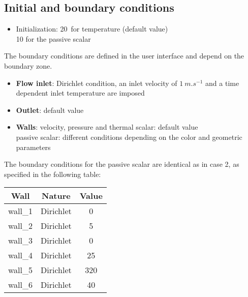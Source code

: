 	\subsection{Initial and boundary conditions}

\begin{itemize}
\renewcommand{\labelitemi}{$\rightarrow$}
	\item Initialization: 20\degresC\ for temperature (default value) \\
	\hspace*{2.1cm}        10 for the passive scalar
\end{itemize}

The boundary conditions are defined in the user interface and depend on the
boundary zone.

\begin{itemize}
	\item {\bfseries Flow inlet}: Dirichlet condition, an inlet velocity of
$1\ m.s^{-1}$ and a time dependent inlet temperature are imposed
	\item {\bfseries Outlet}: default value
	\item {\bfseries Walls}: velocity, pressure and thermal scalar: default value \\
	            \hspace*{1.25cm} passive scalar: different conditions
depending on the color and geometric parameters
\end{itemize}

The boundary conditions for the passive scalar are identical as in case 2,
as specified in the following table:

\begin{center}
\begin{tabular}{|c|c|c|}
\hline
Wall & Nature & Value \\
\hline 
wall\_1 & Dirichlet  & 0 \\ 
\hline 
wall\_2 & Dirichlet  & 5 \\ 
\hline 
wall\_3 & Dirichlet  & 0 \\ 
\hline 
wall\_4 & Dirichlet  & 25 \\ 
\hline 
wall\_5 & Dirichlet  & 320 \\ 
\hline 
wall\_6 & Dirichlet  & 40 \\ 
\hline
\end{tabular} 
\end{center}

